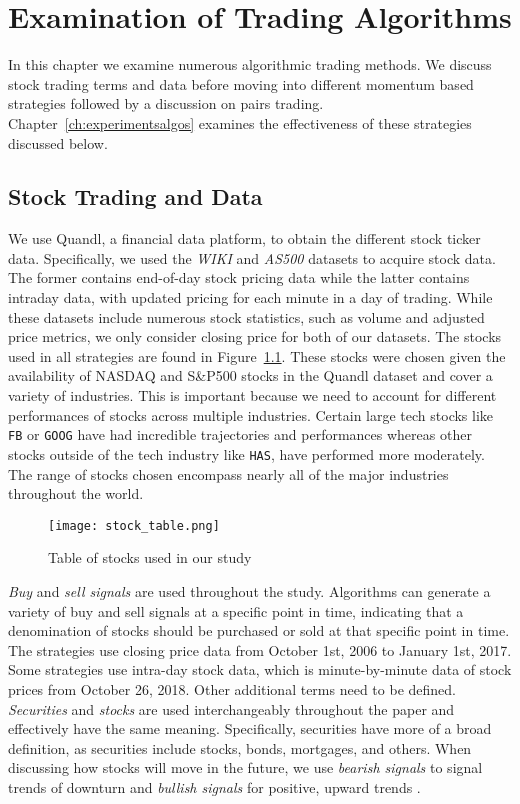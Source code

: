 \documentclass[../thesis.tex]{subfiles}
\begin{document}
\chapter{Examination of Trading Algorithms}
\label{ch:tradingalgos}

In this chapter we examine numerous algorithmic trading methods. We discuss stock trading terms and data before moving into different momentum based strategies followed by a discussion on pairs trading. Chapter~\ref{ch:experimentsalgos} examines the effectiveness of these strategies discussed below. 

\section{Stock Trading and Data}
\label{stocktradingdata}
 
We use Quandl, a financial data platform, to obtain the different stock ticker data. Specifically, we used the \textit{WIKI} and \textit{AS500} datasets to acquire stock data. The former contains end-of-day stock pricing data while the latter contains intraday data, with updated pricing for each minute in a day of trading. While these datasets include numerous stock statistics, such as volume and adjusted price metrics, we only consider closing price for both of our datasets. The stocks used in all strategies are found in Figure~\ref{stocktable}. These stocks were chosen given the availability of NASDAQ and S\&P500 stocks in the Quandl dataset and cover a variety of industries. This is important because we need to account for different performances of stocks across multiple industries. Certain large tech stocks like \texttt{FB} or \texttt{GOOG} have had incredible trajectories and performances whereas other stocks outside of the tech industry like \texttt{HAS}, have performed more moderately. The range of stocks chosen encompass nearly all of the major industries throughout the world.

\begin{figure}[h]
\centering
\texttt{[image: stock\_table.png]}
\caption{Table of stocks used in our study \label{overflow}}
\label{stocktable}
\end{figure}


\textit {Buy} and \textit {sell signals} are used throughout the study. Algorithms can generate a variety of buy and sell signals at a specific point in time, indicating that a denomination of stocks should be purchased or sold at that specific point in time. The strategies use closing price data from October 1st, 2006 to January 1st, 2017. Some strategies use intra-day stock data, which is minute-by-minute data of stock prices from October 26, 2018. Other additional terms need to be defined. \textit {Securities} and \textit{stocks} are used interchangeably throughout the paper and effectively have the same meaning. Specifically, securities have more of a broad definition, as securities include stocks, bonds, mortgages, and others. When discussing how stocks will move in the future, we use \textit {bearish signals} to signal trends of downturn and \textit {bullish signals} for positive, upward trends \cite{Aldridge2010}. 
\end{document}
